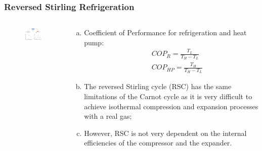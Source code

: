 \documentclass[10pt,compress]{beamer}
\newcommand{\frc}{\displaystyle\frac}
\begin{document}
\begin{frame}
 \frametitle{Reversed Stirling Refrigeration}
  \begin{columns}

   \begin{column}[c]{0.55\linewidth}
    \begin{figure}%
     \begin{center}
      \includegraphics[width=6.8cm,height=6.cm]{./Pics/Overview_Refrig9}
     \end{center}
    \end{figure}  
   \end{column}  

   \begin{column}[c]{0.45\linewidth}
    \begin{enumerate}[(a)]
     \item <1-> Coefficient of Performance for refrigeration and heat pump:
      \begin{eqnarray}
       && COP_{R} = \frc{T_{L}}{T_{H}-T_{L}} \nonumber \\
       && COP_{HP} = \frc{T_{H}}{T_{H}-T_{L}} \nonumber
      \end{eqnarray} 
     \item <2-> The reversed Stirling cycle (RSC) has the same limitations of the Carnot cycle as it is very difficult to achieve isothermal compression and expansion processes with a real gas;
     \item <3-> However, RSC is not very dependent on the internal efficiencies of the compressor and the expander. 
    \end{enumerate}
   \end{column}

  \end{columns}
\end{frame}
\end{document}

